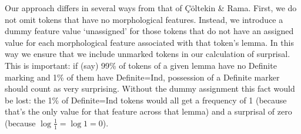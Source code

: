 \documentclass[USenglish]{article}
\begin{document}




Our approach differs in several ways from that of Çöltekin \& Rama.
First, we do not omit tokens that have no morphological features.
Instead, we introduce a dummy feature value `unassigned' for those tokens that do not have an assigned value for each morphological feature associated with that token's lemma.
In this way we ensure that we include unmarked tokens in our calculation of surprisal.
This is important: if (say) 99\% of tokens of a given lemma have no Definite marking and 1\% of them have Definite=Ind, possession of a Definite marker should count as very surprising.
Without the dummy assignment this fact would be lost: the 1\% of Definite=Ind tokens would all get a frequency of 1 (because that's the only value for that feature across that lemma) and a surprisal of zero (because $\log{\frac{1}{1}}=\log{1}=0$).
\end{document}
